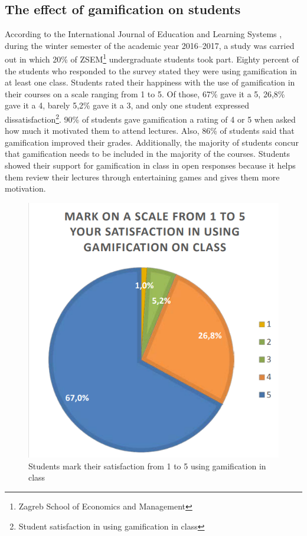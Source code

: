 \documentclass[../main.tex]{subfiles}
\begin{document}
\subsection{The effect of gamification on students}
According to the International Journal of Education and Learning Systems \cite{10}, during the winter semester of the academic year 2016–2017, a study was carried out in which 20\% of ZSEM\footnote{Zagreb School of Economics and Management} undergraduate students took part. Eighty percent of the students who responded to the survey stated they were using gamification in at least one class. Students rated their happiness with the use of gamification in their courses on a scale ranging from 1 to 5. Of those, 67\% gave it a 5, 26,8\% gave it a 4, barely 5,2\% gave it a 3, and only one student expressed dissatisfaction\footnote{Student satisfaction in using gamification in class}.
90\% of students gave gamification a rating of 4 or 5 when asked how much it motivated them to attend lectures. Also, 86\% of students said that gamification improved their grades. Additionally, the majority of students concur that gamification needs to be included in the majority of the courses. Students showed their support for gamification in class in open responses because it helps them review their lectures through entertaining games and gives them more motivation.
\begin{figure}[ht]
\centering
\includegraphics[scale=0.3]{images/chapter1/Students mark their satisfaction from 1 to 5 using gamification in class.png}
\caption{Students mark their satisfaction from 1 to 5 using gamification in class}
\label{fig:Students mark their satisfaction from 1 to 5 using gamification in class}
\end{figure}
\end{document}
